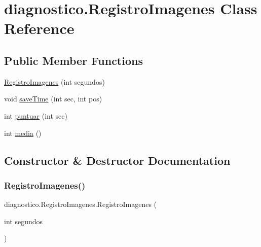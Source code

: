 \hypertarget{classdiagnostico_1_1_registro_imagenes}{}\section{diagnostico.\+Registro\+Imagenes Class Reference}
\label{classdiagnostico_1_1_registro_imagenes}
\subsection*{Public Member Functions}
\begin{DoxyCompactItemize}
\item 
\mbox{\hyperlink{classdiagnostico_1_1_registro_imagenes_a0e8c0decef1d5b59b7af204f3511771d}{Registro\+Imagenes}} (int segundos)
\item 
void \mbox{\hyperlink{classdiagnostico_1_1_registro_imagenes_a1a277de8844dcb424023de04d6723755}{save\+Time}} (int sec, int pos)
\item 
int \mbox{\hyperlink{classdiagnostico_1_1_registro_imagenes_a21db6380ac60fed3754c5de06199df68}{puntuar}} (int sec)
\item 
int \mbox{\hyperlink{classdiagnostico_1_1_registro_imagenes_ab7a4a9b578e26dc7053f909cac2b174d}{media}} ()
\end{DoxyCompactItemize}


\subsection{Constructor \& Destructor Documentation}
\mbox{\label{classdiagnostico_1_1_registro_imagenes_a0e8c0decef1d5b59b7af204f3511771d}} 
\subsubsection{\texorpdfstring{Registro\+Imagenes()}{RegistroImagenes()}}
{\footnotesize\ttfamily diagnostico.\+Registro\+Imagenes.\+Registro\+Imagenes (\begin{DoxyParamCaption}\item[{int}]{segundos }\end{DoxyParamCaption})}




